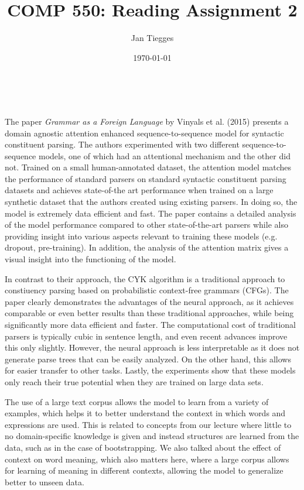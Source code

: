 \documentclass[12pt]{article}
\title{\textbf{COMP 550: Reading Assignment 2}}
\author{Jan Tiegges}
\date{\today}
\makeatletter
\renewcommand{\maketitle}{%
  \begin{center}
    {\large\bfseries\MakeUppercase\@title}\\[1ex]
    \MakeUppercase{\@author \hspace{2em} \@date}
  \end{center}
}
\makeatother
\begin{document}
\maketitle


The paper \textit{Grammar as a Foreign Language} by Vinyals et al. (2015) presents a domain agnostic attention enhanced sequence-to-sequence model for syntactic constituent parsing. The authors experimented with two different sequence-to-sequence models, one of which had an attentional mechanism and the other did not. Trained on a small human-annotated dataset, the attention model matches the performance of standard parsers on standard syntactic constituent parsing datasets and achieves state-of-the art performance when trained on a large synthetic dataset that the authors created using existing parsers. In doing so, the model is extremely data efficient and fast. The paper contains a detailed analysis of the model performance compared to other state-of-the-art parsers while also providing insight into various aspects relevant to training these models (e.g. dropout, pre-training). In addition, the analysis of the attention matrix gives a visual insight into the functioning of the model.

In contrast to their approach, the CYK algorithm is a traditional approach to constiuency parsing based on probabilistic context-free grammars (CFGs). The paper clearly demonstrates the advantages of the neural approach, as it achieves comparable or even better results than these traditional approaches, while being significantly more data efficient and faster. The computational cost of traditional parsers is typically cubic in sentence length, and even recent advances improve this only slightly. However, the neural approach is less interpretable as it does not generate parse trees that can be easily analyzed. On the other hand, this allows for easier transfer to other tasks. Lastly, the experiments show that these models only reach their true potential when they are trained on large data sets.

The use of a large text corpus allows the model to learn from a variety of examples, which helps it to better understand the context in which words and expressions are used. This is related to concepts from our lecture where little to no domain-specific knowledge is given and instead structures are learned from the data, such as in the case of bootstrapping. We also talked about the effect of context on word meaning, which also matters here, where a large corpus allows for learning of meaning in different contexts, allowing the model to generalize better to unseen data.
\end{document}

